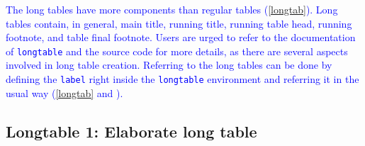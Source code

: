 \documentclass[phd,showgrids]{ndsu-thesis-2022}
\newcommand\italk[1]{\textcolor{blue}{#1}}  %
\newcommand\vb[1]{\textcolor{blue}{\texttt{#1}}}%
\begin{document}
\italk{The long tables have more components than regular tables (\cref{longtab}). Long tables contain, in general, main title, running title, running table head, running footnote, and table final footnote. Users are urged to refer to the documentation of \vb{longtable} and the source code for more details, as there are several aspects involved in long table creation. Referring to the long tables can be done by defining the \texttt{label} right inside the \texttt{longtable} environment and referring it in the usual way (\cref{longtab} and \Cref{longtab}).}

\subsection{Longtable 1: Elaborate long table}
\vspace{2ex}
\setlength\LTleft{0pt}
\setlength\LTright{0pt}
\end{document}
